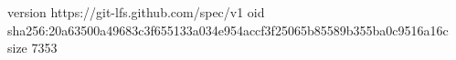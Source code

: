 version https://git-lfs.github.com/spec/v1
oid sha256:20a63500a49683c3f655133a034e954accf3f25065b85589b355ba0c9516a16c
size 7353
